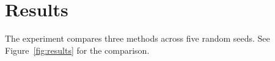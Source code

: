 \documentclass{article}
\begin{document}

\section{Results}
The experiment compares three methods across five random seeds.
See Figure~\ref{fig:results} for the comparison.
\end{document}
